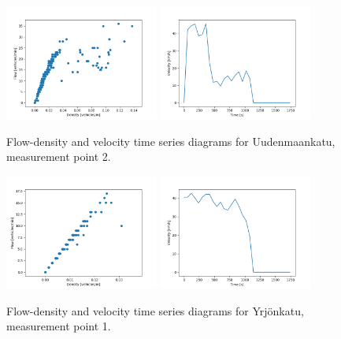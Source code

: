 \documentclass[english, 12pt, a4paper, elec, utf8, pdfa, online]{aaltothesis}
\begin{document}
\clearpage
\begin{figure}[ht!]
    \centering
    \includegraphics[width=0.45\textwidth]{graphs/Uudenmaankatu_2_flw_dns.png}
    \includegraphics[width=0.45\textwidth]{graphs/Uudenmaankatu_2_spd_time_6.png}
    \caption{Flow-density and velocity time series diagrams for Uudenmaankatu, measurement point 2.}
\end{figure}
\begin{figure}[ht!]
    \centering
    \includegraphics[width=0.45\textwidth]{graphs/Yrjonkatu_1_flw_dns.png}
    \includegraphics[width=0.45\textwidth]{graphs/Yrjonkatu_1_spd_time_6.png}
    \caption{Flow-density and velocity time series diagrams for Yrjönkatu, measurement point 1.}
\end{figure}
\end{document}
